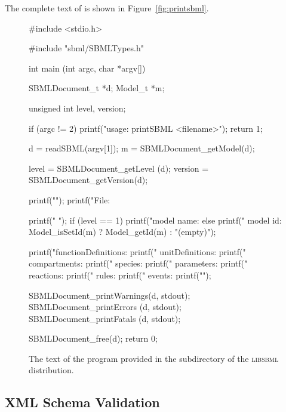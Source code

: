 \documentclass{sbmlmanual}
\newcommand{\libsbml}{\textsc{libsbml}}
\begin{document}
The complete text of  is shown in Figure~\vref{fig:printsbml}.

\begin{figure}
\begin{codeVerbatim}[C,flexiblecolumns=false]
#include <stdio.h>

#include "sbml/SBMLTypes.h"

int
main (int argc, char *argv[])
{
  SBMLDocument_t *d;
  Model_t        *m;

  unsigned int level, version;


  if (argc != 2)
  {
    printf("\n  usage: printSBML <filename>\n\n");
    return 1;
  }

  d = readSBML(argv[1]);
  m = SBMLDocument_getModel(d);

  level   = SBMLDocument_getLevel  (d);
  version = SBMLDocument_getVersion(d);

  printf("\n");
  printf("File: %

  printf("         ");
  if (level == 1)
  {
    printf("model name: %
  }
  else
  {
    printf("  model id: %
           Model_isSetId(m) ? Model_getId(m) : "(empty)");
  }

  printf("functionDefinitions: %
  printf("    unitDefinitions: %
  printf("       compartments: %
  printf("            species: %
  printf("         parameters: %
  printf("          reactions: %
  printf("              rules: %
  printf("             events: %
  printf("\n");

  SBMLDocument_printWarnings(d, stdout);
  SBMLDocument_printErrors  (d, stdout);
  SBMLDocument_printFatals  (d, stdout);

  SBMLDocument_free(d);
  return 0;
}
\end{codeVerbatim}
\caption{The text of the program  provided in the
   subdirectory of the \libsbml{} distribution.}
\label{fig:printsbml}
\end{figure}
                                        

\subsection{XML Schema Validation}
\label{sec:schema-validation}
\end{document}

